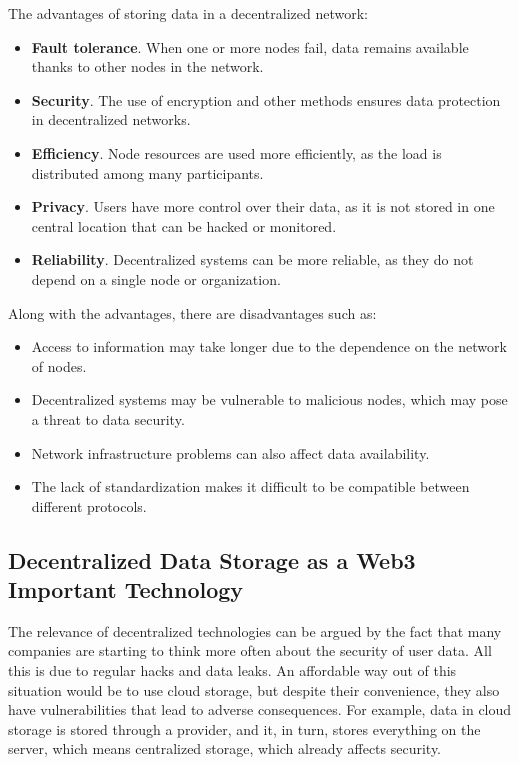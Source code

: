 \documentclass[10pt,conference,a4paper]{IEEEtran_EDM}
\begin{document}
The advantages of storing data in a decentralized network:
\begin{itemize}
    \item \textbf{Fault tolerance}. When one or more nodes fail, data remains available thanks to other nodes in the network.
    \item \textbf{Security}. The use of encryption and other methods ensures data protection in decentralized networks.
    \item \textbf{Efficiency}. Node resources are used more efficiently, as the load is distributed among many participants.
    \item \textbf{Privacy}. Users have more control over their data, as it is not stored in one central location that can be hacked or monitored.
    \item \textbf{Reliability}. Decentralized systems can be more reliable, as they do not depend on a single node or organization.
\end{itemize}
Along with the advantages, there are disadvantages such as:
\begin{itemize}
    \item Access to information may take longer due to the dependence on the network of nodes.
    \item Decentralized systems may be vulnerable to malicious nodes, which may pose a threat to data security.
    \item Network infrastructure problems can also affect data availability.
    \item The lack of standardization makes it difficult to be compatible between different protocols.
\end{itemize}

\subsection{Decentralized Data Storage as a Web3 Important Technology }

The relevance of decentralized technologies can be argued by the fact that many companies are starting to think more often about the security of user data.
All this is due to regular hacks and data leaks.
An affordable way out of this situation would be to use cloud storage, but despite their convenience, they also have vulnerabilities that lead to adverse consequences.
For example, data in cloud storage is stored through a provider, and it, in turn, stores everything on the server, which means centralized storage, which already affects security.
\end{document}
